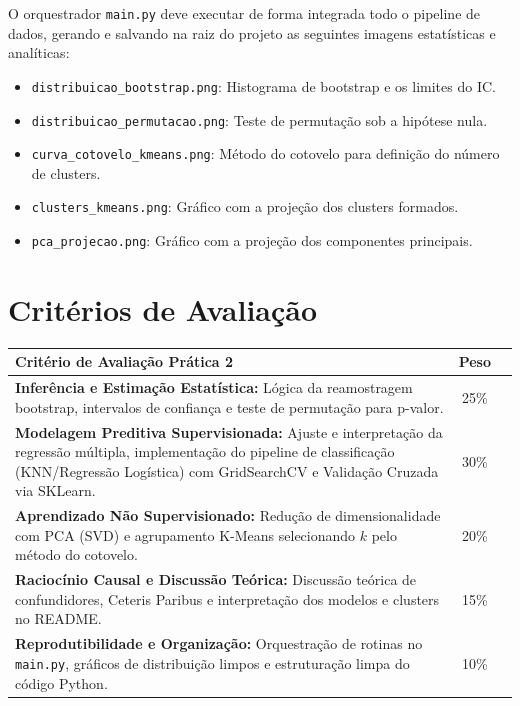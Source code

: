 \documentclass[12pt,a4paper]{article}
\begin{document}
	O orquestrador \texttt{main.py} deve executar de forma integrada todo o pipeline de dados, gerando e salvando na raiz do projeto as seguintes imagens estatísticas e analíticas:
	\begin{itemize}
		\item \texttt{distribuicao\_bootstrap.png}: Histograma de bootstrap e os limites do IC.
		\item \texttt{distribuicao\_permutacao.png}: Teste de permutação sob a hipótese nula.
		\item \texttt{curva\_cotovelo\_kmeans.png}: Método do cotovelo para definição do número de clusters.
		\item \texttt{clusters\_kmeans.png}: Gráfico com a projeção dos clusters formados.
		\item \texttt{pca\_projecao.png}: Gráfico com a projeção dos componentes principais.
	\end{itemize}
	
	\section{Critérios de Avaliação}
	\begin{center}
		\begin{tabular}{p{11.5cm}cc}
			\toprule
			\textbf{Critério de Avaliação Prática 2} & \textbf{Peso} \\
			\midrule
			\textbf{Inferência e Estimação Estatística:} Lógica da reamostragem bootstrap, intervalos de confiança e teste de permutação para p-valor. & 25\% \\
			\addlinespace
			\textbf{Modelagem Preditiva Supervisionada:} Ajuste e interpretação da regressão múltipla, implementação do pipeline de classificação (KNN/Regressão Logística) com GridSearchCV e Validação Cruzada via SKLearn. & 30\% \\
			\addlinespace
			\textbf{Aprendizado Não Supervisionado:} Redução de dimensionalidade com PCA (SVD) e agrupamento K-Means selecionando $k$ pelo método do cotovelo. & 20\% \\
			\addlinespace
			\textbf{Raciocínio Causal e Discussão Teórica:} Discussão teórica de confundidores, Ceteris Paribus e interpretação dos modelos e clusters no README. & 15\% \\
			\addlinespace
			\textbf{Reprodutibilidade e Organização:} Orquestração de rotinas no \texttt{main.py}, gráficos de distribuição limpos e estruturação limpa do código Python. & 10\% \\
			\bottomrule
		\end{tabular}
	\end{center}
	
\end{document}
